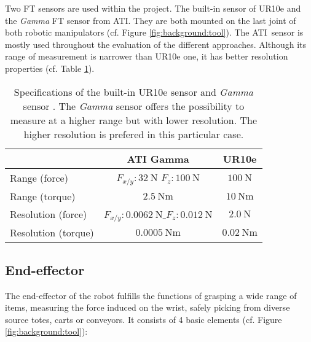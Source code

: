 \documentclass[/home/francois/latex/report/main.tex]{subfiles}
\begin{document}
Two \ac{FT} sensors are used within the project. The built-in sensor of UR10e and the \textit{Gamma} \ac{FT} sensor from ATI\texttrademark. They are both mounted on the last joint of both robotic manipulators (cf. Figure \ref{fig:background:tool}). The ATI\texttrademark \ sensor is mostly used throughout the evaluation of the different approaches. Although its range of measurement is narrower than UR10e one, it has better resolution properties (cf. Table \ref{tab:background:ft-sensor}).

\begin{table}[h!]
  \begin{center}
    \renewcommand{\arraystretch}{1.8} %
    \begin{tabular}{l|c|c} %
      & \textbf{ATI Gamma} & \textbf{UR10e}\\
      \hline
      Range (force)  & $F_{x/y}: 32 \ \si{\newton}$ $F_z: 100 \ \si{\newton}$ & \underline{$100 \ \si{\newton}$} \\
      \hline
      Range (torque)  & $2.5 \ \si{\newton} \si{\meter}$ & \underline{$10 \ \si{\newton} \si{\meter}$} \\
      \hline
      Resolution (force)  & \underline{$F_{x/y}: 0.0062 \ \si{\newton}$ $F_z: 0.012 \ \si{\newton}$} & $2.0 \ \si{\newton}$ \\
      \hline
      Resolution (torque)  & \underline{$0.0005 \ \si{\newton} \si{\meter}$} & $0.02 \ \si{\newton} \si{\meter}$ \\
      \hline
    \end{tabular}
  \end{center}
  \caption{Specifications of the built-in UR10e sensor and \textit{Gamma} sensor \cite{ati, ur10e}. The \textit{Gamma} sensor offers the possibility to measure at a higher range but with lower resolution. The higher resolution is prefered in this particular case.\label{tab:background:ft-sensor}}

\end{table}

\subsection{End-effector}

The end-effector of the robot fulfills the functions of grasping a wide range of items, measuring the force induced on the wrist, safely picking from diverse source totes, carts or conveyors. It consists of 4 basic elements (cf. Figure \ref{fig:background:tool}):
\end{document}
